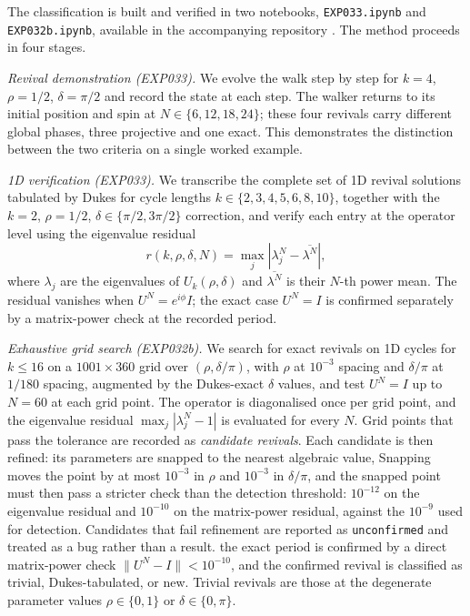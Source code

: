 The classification is built and verified in two notebooks,
\texttt{EXP033.ipynb} and \texttt{EXP032b.ipynb}, available in the
accompanying repository \cite{full_revivals_references}. The method
proceeds in four stages.

\emph{Revival demonstration (EXP033).} We evolve the walk step by step for
$k = 4$, $\rho = 1/2$, $\delta = \pi/2$ and record the state at each
step. The walker returns to its initial position and spin at
$N \in \{6,12,18,24\}$; these four revivals carry different global
phases, three projective and one exact. This demonstrates the
distinction between the two criteria on a single worked example.

\emph{1D verification (EXP033).} We transcribe the complete set of 1D revival
solutions tabulated by Dukes for cycle lengths
$k \in \{2, 3, 4, 5, 6, 8, 10\}$, together with the $k = 2$,
$\rho = 1/2$, $\delta \in \{\pi/2, 3\pi/2\}$ correction, and verify
each entry at the operator level using the eigenvalue residual
\begin{equation}
r(k, \rho, \delta, N)
= \max_j \left| \lambda_j^N - \overline{\lambda^N} \right| ,
\label{eq:eig-residual}
\end{equation}
where $\lambda_j$ are the eigenvalues of $U_k(\rho, \delta)$ and
$\overline{\lambda^N}$ is their $N$-th power mean. The residual
vanishes when $U^N = e^{i\phi} I$; the exact case $U^N = I$ is
confirmed separately by a matrix-power check at the recorded period.

\emph{Exhaustive grid search (EXP032b).} We search for exact
revivals on 1D cycles for $k \le 16$ on a $1001 \times 360$
grid over $(\rho, \delta/\pi)$, with $\rho$ at $10^{-3}$
spacing and $\delta/\pi$ at $1/180$ spacing, augmented by the
Dukes-exact $\delta$ values, and test $U^N = I$ up to $N = 60$
at each grid point. The operator is diagonalised once per grid
point, and the eigenvalue residual $\max_j |\lambda_j^N - 1|$
is evaluated for every $N$. Grid points that pass the tolerance
are recorded as \emph{candidate revivals}. Each candidate is
then refined: its parameters are snapped to the nearest
algebraic value, Snapping moves the point by at most $10^{-3}$ in $\rho$ and
$10^{-3}$ in $\delta/\pi$, and the snapped point must then pass
a stricter check than the detection threshold: $10^{-12}$ on the
eigenvalue residual and $10^{-10}$ on the matrix-power residual,
against the $10^{-9}$ used for detection. Candidates that fail
refinement are reported as \texttt{unconfirmed} and treated as a
bug rather than a result.  the exact period is confirmed by a direct
matrix-power check $\|U^N - I\| < 10^{-10}$, and the confirmed
revival is classified as trivial, Dukes-tabulated, or new.
Trivial revivals are those at the degenerate parameter values
$\rho \in \{0, 1\}$ or $\delta \in \{0, \pi\}$.

